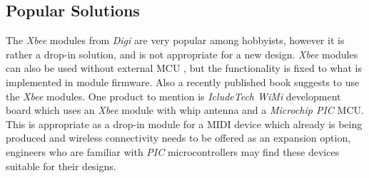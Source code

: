 \subsection{Popular Solutions}

 The \emph{Xbee}\cite{links:digi:xbee} modules from \emph{Digi}
 are very popular among hobbyists, however it is rather a
 drop-in solution, and is not appropriate for a new design.
 \emph{Xbee} modules can also be used without external MCU
 \cite{links:misc:xbeemidi}, but the functionality is fixed
 to what is implemented in module firmware. Also a recently
 published  book suggests to
 use the \emph{Xbee} modules.
 One product to mention is \emph{IcludeTech WiMi} \cite{links:includetech:wimi}
 development board which uses an \emph{Xbee} module with whip antenna and a
 \emph{Microchip PIC} MCU. This is appropriate as a drop-in module
 for a MIDI device which already is being produced and wireless
 connectivity needs to be offered as an expansion option, engineers
 who are familiar with \emph{PIC} microcontrollers may find these
 devices suitable for their designs.
